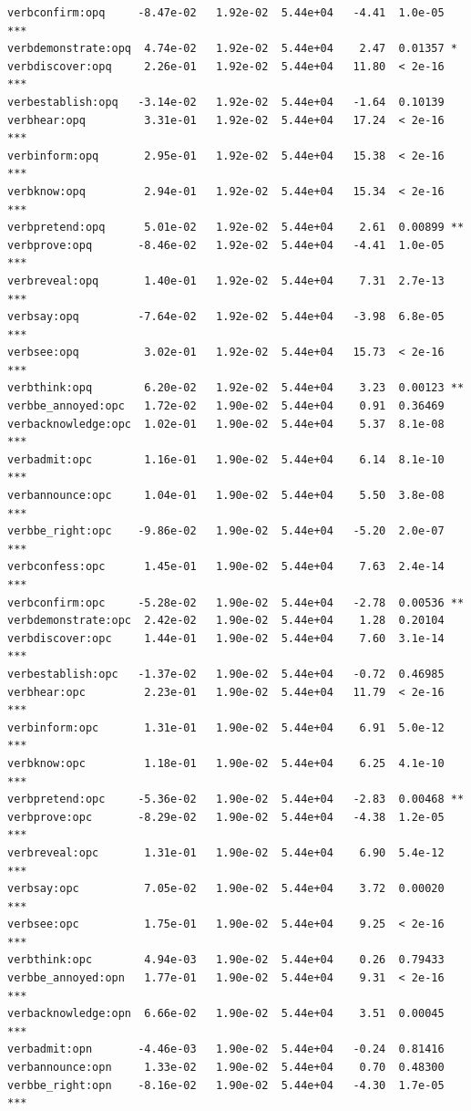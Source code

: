 \documentclass[10pt]{article}\usepackage[]{graphicx}\usepackage[dvipsnames]{xcolor}
\makeatletter
\newenvironment{kframe}{%
 \def\at@end@of@kframe{}%
 \ifinner\ifhmode%
  \def\at@end@of@kframe{\end{minipage}}%
  \begin{minipage}{\columnwidth}%
 \fi\fi%
 \def\FrameCommand##1{\hskip\@totalleftmargin \hskip-\fboxsep
 \colorbox{shadecolor}{##1}\hskip-\fboxsep
     \hskip-\linewidth \hskip-\@totalleftmargin \hskip\columnwidth}%
 \MakeFramed {\advance\hsize-\width
   \@totalleftmargin\z@ \linewidth\hsize
   \@setminipage}}%
 {\par\unskip\endMakeFramed%
 \at@end@of@kframe}
\newenvironment{knitrout}{}{} %
\makeatother
\begin{document}
\begin{knitrout}
\begin{kframe}
\begin{verbatim}
verbconfirm:opq     -8.47e-02   1.92e-02  5.44e+04   -4.41  1.0e-05 ***
verbdemonstrate:opq  4.74e-02   1.92e-02  5.44e+04    2.47  0.01357 *  
verbdiscover:opq     2.26e-01   1.92e-02  5.44e+04   11.80  < 2e-16 ***
verbestablish:opq   -3.14e-02   1.92e-02  5.44e+04   -1.64  0.10139    
verbhear:opq         3.31e-01   1.92e-02  5.44e+04   17.24  < 2e-16 ***
verbinform:opq       2.95e-01   1.92e-02  5.44e+04   15.38  < 2e-16 ***
verbknow:opq         2.94e-01   1.92e-02  5.44e+04   15.34  < 2e-16 ***
verbpretend:opq      5.01e-02   1.92e-02  5.44e+04    2.61  0.00899 ** 
verbprove:opq       -8.46e-02   1.92e-02  5.44e+04   -4.41  1.0e-05 ***
verbreveal:opq       1.40e-01   1.92e-02  5.44e+04    7.31  2.7e-13 ***
verbsay:opq         -7.64e-02   1.92e-02  5.44e+04   -3.98  6.8e-05 ***
verbsee:opq          3.02e-01   1.92e-02  5.44e+04   15.73  < 2e-16 ***
verbthink:opq        6.20e-02   1.92e-02  5.44e+04    3.23  0.00123 ** 
verbbe_annoyed:opc   1.72e-02   1.90e-02  5.44e+04    0.91  0.36469    
verbacknowledge:opc  1.02e-01   1.90e-02  5.44e+04    5.37  8.1e-08 ***
verbadmit:opc        1.16e-01   1.90e-02  5.44e+04    6.14  8.1e-10 ***
verbannounce:opc     1.04e-01   1.90e-02  5.44e+04    5.50  3.8e-08 ***
verbbe_right:opc    -9.86e-02   1.90e-02  5.44e+04   -5.20  2.0e-07 ***
verbconfess:opc      1.45e-01   1.90e-02  5.44e+04    7.63  2.4e-14 ***
verbconfirm:opc     -5.28e-02   1.90e-02  5.44e+04   -2.78  0.00536 ** 
verbdemonstrate:opc  2.42e-02   1.90e-02  5.44e+04    1.28  0.20104    
verbdiscover:opc     1.44e-01   1.90e-02  5.44e+04    7.60  3.1e-14 ***
verbestablish:opc   -1.37e-02   1.90e-02  5.44e+04   -0.72  0.46985    
verbhear:opc         2.23e-01   1.90e-02  5.44e+04   11.79  < 2e-16 ***
verbinform:opc       1.31e-01   1.90e-02  5.44e+04    6.91  5.0e-12 ***
verbknow:opc         1.18e-01   1.90e-02  5.44e+04    6.25  4.1e-10 ***
verbpretend:opc     -5.36e-02   1.90e-02  5.44e+04   -2.83  0.00468 ** 
verbprove:opc       -8.29e-02   1.90e-02  5.44e+04   -4.38  1.2e-05 ***
verbreveal:opc       1.31e-01   1.90e-02  5.44e+04    6.90  5.4e-12 ***
verbsay:opc          7.05e-02   1.90e-02  5.44e+04    3.72  0.00020 ***
verbsee:opc          1.75e-01   1.90e-02  5.44e+04    9.25  < 2e-16 ***
verbthink:opc        4.94e-03   1.90e-02  5.44e+04    0.26  0.79433    
verbbe_annoyed:opn   1.77e-01   1.90e-02  5.44e+04    9.31  < 2e-16 ***
verbacknowledge:opn  6.66e-02   1.90e-02  5.44e+04    3.51  0.00045 ***
verbadmit:opn       -4.46e-03   1.90e-02  5.44e+04   -0.24  0.81416    
verbannounce:opn     1.33e-02   1.90e-02  5.44e+04    0.70  0.48300    
verbbe_right:opn    -8.16e-02   1.90e-02  5.44e+04   -4.30  1.7e-05 ***

\end{verbatim}
\end{kframe}
\end{knitrout}
\end{document}
